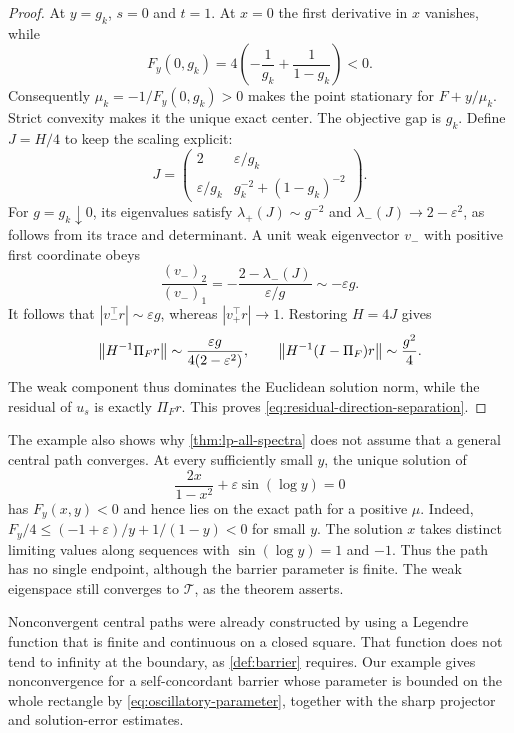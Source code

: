 \begin{proof}
At $y=g_k$, $s=0$ and $t=1$. At $x=0$ the first derivative in $x$
vanishes, while
\[
 F_y(0,g_k)=4\left(-\frac1{g_k}+\frac1{1-g_k}\right)<0.
\]
Consequently $\mu_k=-1/F_y(0,g_k)>0$ makes the point stationary
for $F+y/\mu_k$. Strict convexity makes it the unique exact center.
The objective gap is $g_k$. Define $J=H/4$ to keep the scaling explicit:
\begin{equation}
 J=\begin{pmatrix}2&\varepsilon/g_k\\
             \varepsilon/g_k&g_k^{-2}+(1-g_k)^{-2}\end{pmatrix}.
 \label{eq:oscillatory-hessian}
\end{equation}
For $g=g_k\downarrow0$, its eigenvalues satisfy
$\lambda_+(J)\sim g^{-2}$ and
$\lambda_-(J)\to2-\varepsilon^2$, as follows from its trace and
determinant. A unit weak eigenvector $v_-$ with positive first
coordinate obeys
\[
 \frac{(v_-)_2}{(v_-)_1}
 =-\frac{2-\lambda_-(J)}{\varepsilon/g}
 \sim-\varepsilon g.
\]
It follows that $|v_-^\top r|\sim\varepsilon g$, whereas
$|v_+^\top r|\to1$. Restoring $H=4J$ gives
\begin{equation}
 \left\lVert H^{-1}\Pi_F r\right\rVert\sim
   \frac{\varepsilon g}{4(2-\varepsilon^2)},\qquad
 \left\lVert H^{-1}(I-\Pi_F)r\right\rVert\sim\frac{g^2}{4}.
 \label{eq:oscillatory-solution-components}
\end{equation}
The weak component thus dominates the Euclidean solution norm, while
the residual of $u_s$ is exactly $\Pi_Fr$.
This proves \eqref{eq:residual-direction-separation}.
\end{proof}

The example also shows why \cref{thm:lp-all-spectra} does not assume
that a general central path converges. At every
sufficiently small $y$, the unique solution of
\[
 \frac{2x}{1-x^2}+\varepsilon\sin(\log y)=0
\]
has $F_y(x,y)<0$ and hence lies on the exact path for a positive $\mu$.
Indeed, $F_y/4\leq(-1+\varepsilon)/y+1/(1-y)<0$ for small $y$.
The solution $x$ takes distinct limiting values along sequences with
$\sin(\log y)=1$ and $-1$. Thus the path has no single endpoint,
although the barrier parameter is finite. The weak eigenspace still
converges to $\mathcal T$, as the theorem asserts.

Nonconvergent central paths were already constructed by
\citet{boltepauwels2022} using a Legendre function that is finite and
continuous on a closed square. That function does not tend to
infinity at the boundary, as \cref{def:barrier} requires. Our example
gives nonconvergence for a self-concordant barrier whose parameter
is bounded on the whole rectangle by \eqref{eq:oscillatory-parameter},
together with the sharp projector and solution-error estimates.
